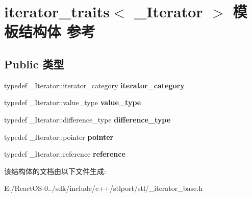 \hypertarget{structiterator__traits}{}\section{iterator\+\_\+traits$<$ \+\_\+\+Iterator $>$ 模板结构体 参考}
\label{structiterator__traits}
\subsection*{Public 类型}
\begin{DoxyCompactItemize}
\item 
\mbox{\label{structiterator__traits_a994759ac541bcc53484e4e78a08deb85}} 
typedef \+\_\+\+Iterator\+::iterator\+\_\+category {\bfseries iterator\+\_\+category}
\item 
\mbox{\label{structiterator__traits_a33a19659f3db6635e77bb7e7f7aa40cd}} 
typedef \+\_\+\+Iterator\+::value\+\_\+type {\bfseries value\+\_\+type}
\item 
\mbox{\label{structiterator__traits_a792b8e3a40e5e6c8e2d831c1497f79f6}} 
typedef \+\_\+\+Iterator\+::difference\+\_\+type {\bfseries difference\+\_\+type}
\item 
\mbox{\label{structiterator__traits_ab60ae4e3ff9cc8e322da0511c5d7aca1}} 
typedef \+\_\+\+Iterator\+::pointer {\bfseries pointer}
\item 
\mbox{\label{structiterator__traits_a4a12c0858cc12566b30088115ae77cc9}} 
typedef \+\_\+\+Iterator\+::reference {\bfseries reference}
\end{DoxyCompactItemize}


该结构体的文档由以下文件生成\+:\begin{DoxyCompactItemize}
\item 
E\+:/\+React\+O\+S-\/0../sdk/include/c++/stlport/stl/\+\_\+iterator\+\_\+base.\+h\end{DoxyCompactItemize}
